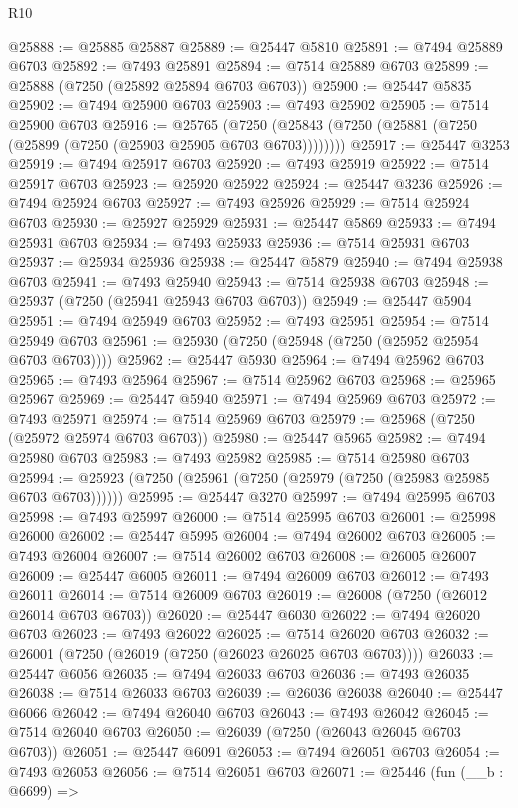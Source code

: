 \begin{lexlean}{R10}
\begin{coremodule}
{{{{{{{{{{{{{{{{{{{{{{{{{{{{{{{{{{{{{{{{{{{{{{{{{{{{{{{{{{{{{{{{{{{{{{{{{{{{{{{{{{{{@25888 := @25885 @25887
@25889 := @25447 @5810
@25891 := @7494 @25889 @6703
@25892 := @7493 @25891
@25894 := @7514 @25889 @6703
@25899 := @25888 (@7250 (@25892 @25894 @6703 @6703))
@25900 := @25447 @5835
@25902 := @7494 @25900 @6703
@25903 := @7493 @25902
@25905 := @7514 @25900 @6703
@25916 := @25765
    (@7250 (@25843 (@7250 (@25881 (@7250 (@25899 (@7250 (@25903 @25905 @6703 @6703))))))))
@25917 := @25447 @3253
@25919 := @7494 @25917 @6703
@25920 := @7493 @25919
@25922 := @7514 @25917 @6703
@25923 := @25920 @25922
@25924 := @25447 @3236
@25926 := @7494 @25924 @6703
@25927 := @7493 @25926
@25929 := @7514 @25924 @6703
@25930 := @25927 @25929
@25931 := @25447 @5869
@25933 := @7494 @25931 @6703
@25934 := @7493 @25933
@25936 := @7514 @25931 @6703
@25937 := @25934 @25936
@25938 := @25447 @5879
@25940 := @7494 @25938 @6703
@25941 := @7493 @25940
@25943 := @7514 @25938 @6703
@25948 := @25937 (@7250 (@25941 @25943 @6703 @6703))
@25949 := @25447 @5904
@25951 := @7494 @25949 @6703
@25952 := @7493 @25951
@25954 := @7514 @25949 @6703
@25961 := @25930 (@7250 (@25948 (@7250 (@25952 @25954 @6703 @6703))))
@25962 := @25447 @5930
@25964 := @7494 @25962 @6703
@25965 := @7493 @25964
@25967 := @7514 @25962 @6703
@25968 := @25965 @25967
@25969 := @25447 @5940
@25971 := @7494 @25969 @6703
@25972 := @7493 @25971
@25974 := @7514 @25969 @6703
@25979 := @25968 (@7250 (@25972 @25974 @6703 @6703))
@25980 := @25447 @5965
@25982 := @7494 @25980 @6703
@25983 := @7493 @25982
@25985 := @7514 @25980 @6703
@25994 := @25923 (@7250 (@25961 (@7250 (@25979 (@7250 (@25983 @25985 @6703 @6703))))))
@25995 := @25447 @3270
@25997 := @7494 @25995 @6703
@25998 := @7493 @25997
@26000 := @7514 @25995 @6703
@26001 := @25998 @26000
@26002 := @25447 @5995
@26004 := @7494 @26002 @6703
@26005 := @7493 @26004
@26007 := @7514 @26002 @6703
@26008 := @26005 @26007
@26009 := @25447 @6005
@26011 := @7494 @26009 @6703
@26012 := @7493 @26011
@26014 := @7514 @26009 @6703
@26019 := @26008 (@7250 (@26012 @26014 @6703 @6703))
@26020 := @25447 @6030
@26022 := @7494 @26020 @6703
@26023 := @7493 @26022
@26025 := @7514 @26020 @6703
@26032 := @26001 (@7250 (@26019 (@7250 (@26023 @26025 @6703 @6703))))
@26033 := @25447 @6056
@26035 := @7494 @26033 @6703
@26036 := @7493 @26035
@26038 := @7514 @26033 @6703
@26039 := @26036 @26038
@26040 := @25447 @6066
@26042 := @7494 @26040 @6703
@26043 := @7493 @26042
@26045 := @7514 @26040 @6703
@26050 := @26039 (@7250 (@26043 @26045 @6703 @6703))
@26051 := @25447 @6091
@26053 := @7494 @26051 @6703
@26054 := @7493 @26053
@26056 := @7514 @26051 @6703
@26071 := @25446
    (fun (__b : @6699) =>
}}}}}}}}}}}}}}}}}}}}}}}}}}}}}}}}}}}}}}}}}}}}}}}}}}}}}}}}}}}}}}}}}}}}}}}}}}}}}}}}}}}}
\end{coremodule}
\end{lexlean}
